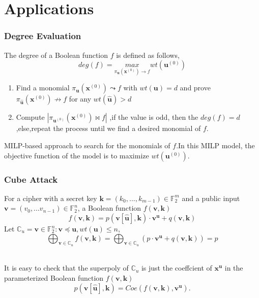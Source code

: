 \documentclass[notheorems, aspectratio=169]{beamer}
\def\bd#1{\boldsymbol{#1}}
\begin{document}
\section{ Applications}
\begin{frame}
    \frametitle{Degree Evaluation}
    The degree of a Boolean function $f$ is defined as follows,
    $$
        deg(f)={max}\limits_{\pi_{\bd{u}}(\bd{x}^{(0)})\rightarrow f}   wt(\bd{u}^{(0)})    
    $$
    \begin{enumerate}
        \item Find a monomial $\pi_{\bd{u}}(\bd{x}^{(0)}) \leadsto f$ with $wt(\bd{u})=d$ and prove 
        $\pi_{\hat{\bd{u}}}(\bd{x}^{(0)}) \not \rightarrow f$ for any $wt(\hat{\bd{u}})>d$
        \item Compute $|\pi_{\boldsymbol{u}^{(0)}}(\boldsymbol{x}^{(0)}) \bowtie f|$ ,if the value is odd,
        then the $deg(f)=d$,else,repeat the process until we find a desired monomial of $f$.
    \end{enumerate}
    MILP-based approach to search for the monomials of $f$.In this MILP model, the objective function of the
    model is to maximize $wt(\bd{u}^{(0)})$.    
\end{frame}
\begin{frame}
    \frametitle{Cube Attack}
    For a cipher with a secret key $\bd{k}=(k_0,...,k_{m-1}) \in  \mathbb{F}^m_2$ and a public input $\bd{v}=(v_0,...v_{n-1}) \in \mathbb{F}^n_2$, a Boolean function $f(\bd{v},\bd{k})$
        $$
        f(\boldsymbol{v},\boldsymbol{k})=p(\boldsymbol{v}[\hat{\boldsymbol{u}}],\boldsymbol{k}) \cdot \boldsymbol{v}^{\boldsymbol{u}}
        +q(\boldsymbol{v},\boldsymbol{k})
        $$
        Let $\mathbb{C}_u ={\boldsymbol{v} \in \mathbb{F}^n_2:\boldsymbol{v}} \preceq \boldsymbol{u},wt(\bd{u})\le n$, 
        $$
        \bigoplus_{\boldsymbol{v} \in \mathbb{C}_u}f(\boldsymbol{v},\boldsymbol{k})=\bigoplus_{\boldsymbol{v}\in \mathbb{C}_u}(p \cdot \boldsymbol{v}^{\boldsymbol{u}}+q(\boldsymbol{v},\boldsymbol{k}))=p
        $$
        
        \\It is easy to check that the superpoly of $\mathbb{C}_u$ is just the coeffcient of $\boldsymbol{x}^{\boldsymbol{u}}$ in the
        parameterized Boolean function $f(\boldsymbol{v},\bd{k}) $
        $$
        p(\boldsymbol{v}[\hat{\boldsymbol{u}}],\boldsymbol{k})=Coe(f(\bd{v},\bd{k}),\bd{v}^{\bd{u}}).
        $$

\end{frame}
\end{document}
